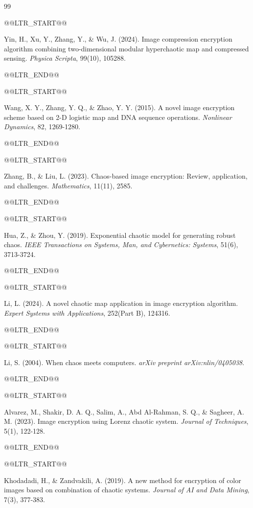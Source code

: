 \renewcommand{\bibname}{فهرست منابع}
\addcontentsline{toc}{chapter}{\bibname}
\begin{thebibliography}{99}

@@LTR_START@@

 Yin, H., Xu, Y., Zhang, Y., \& Wu, J. (2024). Image compression encryption algorithm combining two-dimensional modular hyperchaotic map and compressed sensing. \textit{Physica Scripta}, 99(10), 105288.

@@LTR_END@@

@@LTR_START@@

 Wang, X. Y., Zhang, Y. Q., \& Zhao, Y. Y. (2015). A novel image encryption scheme based on 2-D logistic map and DNA sequence operations. \textit{Nonlinear Dynamics}, 82, 1269-1280.

@@LTR_END@@

@@LTR_START@@

 Zhang, B., \& Liu, L. (2023). Chaos-based image encryption: Review, application, and challenges. \textit{Mathematics}, 11(11), 2585.

@@LTR_END@@

@@LTR_START@@

 Hua, Z., \& Zhou, Y. (2019). Exponential chaotic model for generating robust chaos. \textit{IEEE Transactions on Systems, Man, and Cybernetics: Systems}, 51(6), 3713-3724.

@@LTR_END@@

@@LTR_START@@

 Li, L. (2024). A novel chaotic map application in image encryption algorithm. \textit{Expert Systems with Applications}, 252(Part B), 124316.

@@LTR_END@@

@@LTR_START@@

 Li, S. (2004). When chaos meets computers. \textit{arXiv preprint arXiv:nlin/0405038}.

@@LTR_END@@

@@LTR_START@@

 Alvarez, M., Shakir, D. A. Q., Salim, A., Abd Al-Rahman, S. Q., \& Sagheer, A. M. (2023). Image encryption using Lorenz chaotic system. \textit{Journal of Techniques}, 5(1), 122-128.

@@LTR_END@@

@@LTR_START@@

 Khodadadi, H., \& Zandvakili, A. (2019). A new method for encryption of color images based on combination of chaotic systems. \textit{Journal of AI and Data Mining}, 7(3), 377-383.


\end{thebibliography}
